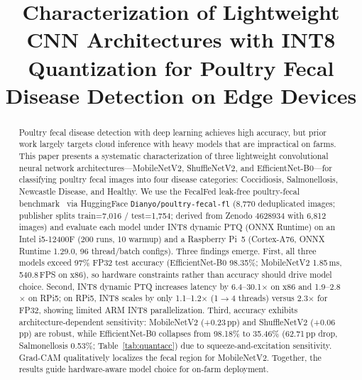 \documentclass[conference,a4paper]{IEEEtran}
\begin{document}
\title{Characterization of Lightweight CNN Architectures with INT8 Quantization for Poultry Fecal Disease Detection on Edge Devices}

\author{
\and
{}
}

\maketitle

\begin{abstract}
Poultry fecal disease detection with deep learning achieves high accuracy, but prior work largely targets cloud inference with heavy models that are impractical on farms. This paper presents a systematic characterization of three lightweight convolutional neural network architectures---MobileNetV2, ShuffleNetV2, and EfficientNet-B0---for classifying poultry fecal images into four disease categories: Coccidiosis, Salmonellosis, Newcastle Disease, and Healthy. We use the FecalFed leak-free poultry-fecal benchmark~\cite{chi2026} via HuggingFace \texttt{Dianyo/poultry-fecal-fl} (8,770 deduplicated images; publisher splits train=7,016 / test=1,754; derived from Zenodo 4628934 with 6,812 images) and evaluate each model under INT8 dynamic PTQ (ONNX Runtime) on an Intel i5-12400F (200 runs, 10 warmup) and a Raspberry Pi~5 (Cortex-A76, ONNX Runtime 1.29.0, 96 thread/batch configs). Three findings emerge. First, all three models exceed 97\% FP32 test accuracy (EfficientNet-B0 98.35\%; MobileNetV2 1.85\,ms, 540.8\,FPS on x86), so hardware constraints rather than accuracy should drive model choice. Second, INT8 dynamic PTQ increases latency by 6.4--30.1$\times$ on x86 and 1.9--2.8$\times$ on RPi5; on RPi5, INT8 scales by only 1.1--1.2$\times$ (1$\rightarrow$4 threads) versus 2.3$\times$ for FP32, showing limited ARM INT8 parallelization. Third, accuracy exhibits architecture-dependent sensitivity: MobileNetV2 (+0.23\,pp) and ShuffleNetV2 (+0.06\,pp) are robust, while EfficientNet-B0 collapses from 98.18\% to 35.46\% (62.71\,pp drop, Salmonellosis 0.53\%; Table~\ref{tab:quantacc}) due to squeeze-and-excitation sensitivity. Grad-CAM qualitatively localizes the fecal region for MobileNetV2. Together, the results guide hardware-aware model choice for on-farm deployment.
\end{abstract}
\end{document}
